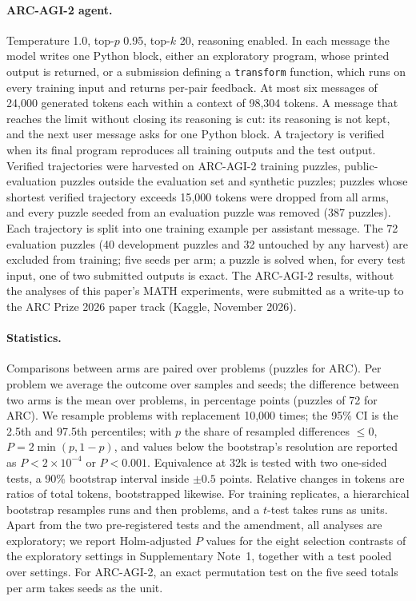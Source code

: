 \documentclass[10pt]{article}
\begin{document}
\paragraph{ARC-AGI-2 agent.} Temperature 1.0, top-$p$ 0.95, top-$k$ 20, reasoning enabled. In each message the model writes one Python block, either an exploratory program, whose printed output is returned, or a submission defining a \texttt{transform} function, which runs on every training input and returns per-pair feedback. At most six messages of 24{,}000 generated tokens each within a context of 98{,}304 tokens. A message that reaches the limit without closing its reasoning is cut: its reasoning is not kept, and the next user message asks for one Python block. A trajectory is verified when its final program reproduces all training outputs and the test output. Verified trajectories were harvested on ARC-AGI-2 training puzzles, public-evaluation puzzles outside the evaluation set and synthetic puzzles; puzzles whose shortest verified trajectory exceeds 15{,}000 tokens were dropped from all arms, and every puzzle seeded from an evaluation puzzle was removed (387 puzzles). Each trajectory is split into one training example per assistant message. The 72 evaluation puzzles (40 development puzzles and 32 untouched by any harvest) are excluded from training; five seeds per arm; a puzzle is solved when, for every test input, one of two submitted outputs is exact. The ARC-AGI-2 results, without the analyses of this paper's MATH experiments, were submitted as a write-up to the ARC Prize 2026 paper track (Kaggle, November 2026).

\paragraph{Statistics.} Comparisons between arms are paired over problems (puzzles for ARC). Per problem we average the outcome over samples and seeds; the difference between two arms is the mean over problems, in percentage points (puzzles of 72 for ARC). We resample problems with replacement 10{,}000 times\cite{efron1993bootstrap}; the 95\% CI is the 2.5th and 97.5th percentiles; with $p$ the share of resampled differences $\le0$, $P=2\min(p,1-p)$, and values below the bootstrap's resolution are reported as $P<2\times10^{-4}$ or $P<0.001$. Equivalence at 32k is tested with two one-sided tests, a 90\% bootstrap interval inside $\pm0.5$ points. Relative changes in tokens are ratios of total tokens, bootstrapped likewise. For training replicates, a hierarchical bootstrap resamples runs and then problems, and a $t$-test takes runs as units. Apart from the two pre-registered tests and the amendment, all analyses are exploratory; we report Holm-adjusted $P$ values for the eight selection contrasts of the exploratory settings in Supplementary Note~1, together with a test pooled over settings. For ARC-AGI-2, an exact permutation test on the five seed totals per arm takes seeds as the unit.
\end{document}
